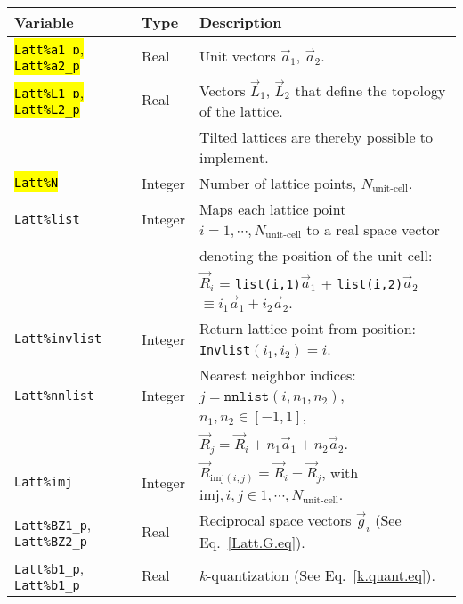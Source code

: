 %
\begin{table}[h]
	\begin{center}
   \begin{tabular}{@{} l l l @{}}\toprule
    Variable  & Type & Description \\\midrule
     \hl{\texttt{Latt\%a1\_p}, \texttt{Latt\%a2\_p}}   & Real     & Unit vectors $\vec{a}_1$,  $\vec{a}_2$. \\ 
     \hl{\texttt{Latt\%L1\_p}, \texttt{Latt\%L2\_p}}   & Real     & Vectors $\vec{L}_1$, $\vec{L}_2$ that define the topology of the  lattice. \\
     									  &              &  Tilted lattices are  thereby possible to implement.  \\
    \hl{\texttt{Latt\%N}}                                                 &   Integer &  Number of lattice points, $N_{\text{unit-cell}}$.   \\
    \texttt{Latt\%list}                                               & Integer &  Maps each lattice point $i=1,\cdots, N_{\text{unit-cell}}$ to a real space vector\\ 
                                                                             &   &  denoting the position of the unit cell: \\
                                                                             &   & $\vec{R}_i$ = \texttt{list(i,1)}$\vec{a}_1$ + \texttt{list(i,2)}$\vec{a}_2$  $  \equiv i_1  \vec{a}_1 + i_2  \vec{a}_2 $. \\
    \texttt{Latt\%invlist}                                        &  Integer &   Return lattice point from position: \texttt{Invlist}$(i_1,i_2) = i $. \\
    \texttt{Latt\%nnlist}                                         &  Integer &  Nearest neighbor indices: $j = \texttt{nnlist} (i, n_1, n_2) $,  $n_1, n_2 \in [-1,1] $, \\
                                                                           &              &    $\vec{R}_j = \vec{R}_i + n_1 \vec{a}_1  + n_2 \vec{a}_2 $. \\
   \texttt{Latt\%imj}                                             &   Integer  &  $\vec{R}_{\mathrm{imj}(i,j)}  =  \vec{R}_i -  \vec{R}_j$, with  $\mathrm{imj}, i, j \in  1,\cdots, N_{\text{unit-cell}}$.\\
    \texttt{Latt\%BZ1\_p}, \texttt{Latt\%BZ2\_p}  &   Real     & Reciprocal space vectors $\vec{g}_i$   (See Eq.~\ref{Latt.G.eq}).\\
    \texttt{Latt\%b1\_p}, \texttt{Latt\%b1\_p}       &   Real     &  $k$-quantization (See Eq.~\ref{k.quant.eq}). \\

\end{tabular}
\end{center}
\end{table}

